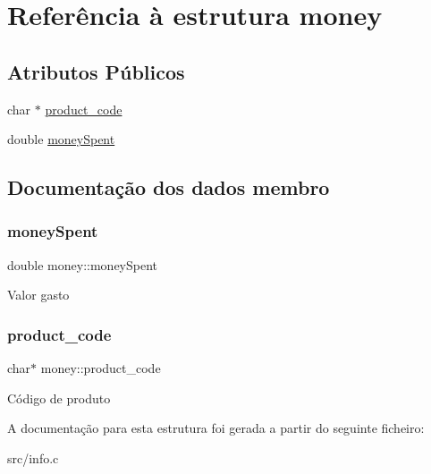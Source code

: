 \hypertarget{structmoney}{}\section{Referência à estrutura money}
\label{structmoney}
\subsection*{Atributos Públicos}
\begin{DoxyCompactItemize}
\item 
char $\ast$ \hyperlink{structmoney_a339b6ee86da7223cf5e495befd6e2d47}{product\+\_\+code}
\item 
double \hyperlink{structmoney_a83730022a5ad4ba65be8e5e55e575de4}{money\+Spent}
\end{DoxyCompactItemize}


\subsection{Documentação dos dados membro}
\mbox{\label{structmoney_a83730022a5ad4ba65be8e5e55e575de4}} 
\subsubsection{\texorpdfstring{money\+Spent}{moneySpent}}
{\footnotesize\ttfamily double money\+::money\+Spent}

Valor gasto \mbox{\label{structmoney_a339b6ee86da7223cf5e495befd6e2d47}} 
\subsubsection{\texorpdfstring{product\+\_\+code}{product\_code}}
{\footnotesize\ttfamily char$\ast$ money\+::product\+\_\+code}

Código de produto 

A documentação para esta estrutura foi gerada a partir do seguinte ficheiro\+:\begin{DoxyCompactItemize}
\item 
src/info.\+c\end{DoxyCompactItemize}
